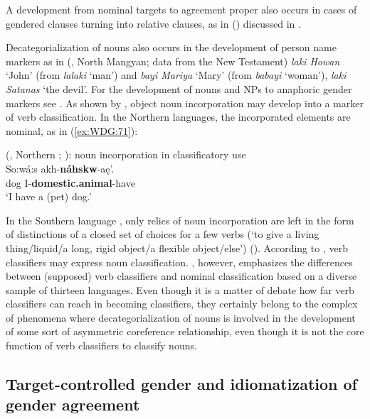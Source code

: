 \documentclass[output=collectionpaper]{langsci/langscibook}
\begin{document}
A development from nominal targets to agreement proper also occurs in cases of gendered clauses turning into relative clauses, as in  (\citealt{Reid1997}) discussed in .

Decategorialization of nouns also occurs in the development of person name markers as in  (, North Mangyan; data from the New Testament) \textit{laki Howan} `John' (from \textit{lalaki} `man') and \textit{bayi Mariya} `Mary' (from \textit{babayi} `woman'), \textit{laki Satanas} `the devil'. For the development of nouns and NPs to anaphoric gender markers see . As shown by \cite{Mithun1986}, object noun incorporation may develop into a marker of verb classification. In the Northern  languages, the incorporated elements are nominal, as in (\ref{ex:WDG:71}):

\ea\label{ex:WDG:71}
 (, Northern ; \citealt{Mithun1986}): noun incorporation in classificatory use\\
\gll So:wá:s	akh-\textbf{náhskw}-aę'.\\
dog	I-\textbf{domestic.animal}-have\\
\glt `I have a (pet) dog.'\\
\z

In the Southern  language , only relics of noun incorporation are left in the form of distinctions of a closed set of choices for a few verbs (`to give a living thing/liquid/a long, rigid object/a flexible object/else') (\citealt[392]{Mithun1986}). According to \cite{Mithun1986}, verb classifiers may express noun classification. \cite{Passer2016a}, however, emphasizes the differences between (supposed) verb classifiers and nominal classification based on a diverse sample of thirteen languages. Even though it is a matter of debate how far verb classifiers can reach in becoming classifiers, they certainly belong to the complex of phenomena where decategorialization of nouns is involved in the development of some sort of asymmetric coreference relationship, even though it is not the core function of verb classifiers to classify nouns.

  \subsection{Target-controlled gender and idiomatization of gender agreement}
\label{sec:WDG:7.7}
\end{document}
